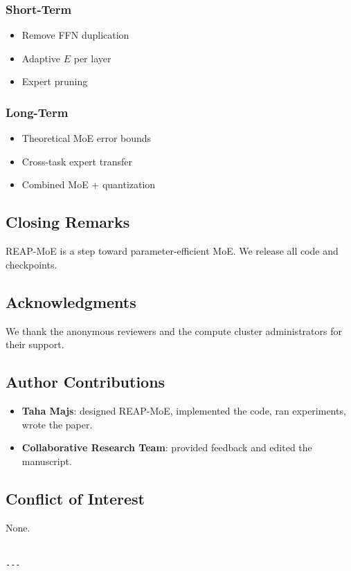 \subsubsection{Short-Term}
\begin{itemize}
\item Remove FFN duplication
\item Adaptive $E$ per layer
\item Expert pruning

\end{itemize}
\subsubsection{Long-Term}
\begin{itemize}
\item Theoretical MoE error bounds
\item Cross-task expert transfer
\item Combined MoE + quantization

\end{itemize}
\subsection{Closing Remarks}

REAP-MoE is a step toward parameter-efficient MoE. We release all code and 
checkpoints.

\subsection{Acknowledgments}

We thank the anonymous reviewers and the compute cluster administrators for their support.

\subsection{Author Contributions}

\begin{itemize}
\item \textbf{Taha Majs}: designed REAP-MoE, implemented the code, ran experiments,
  wrote the paper.
\item \textbf{Collaborative Research Team}: provided feedback and edited the manuscript.

\end{itemize}
\subsection{Conflict of Interest}

None.
\begin{lstlisting}

---
\end{lstlisting}